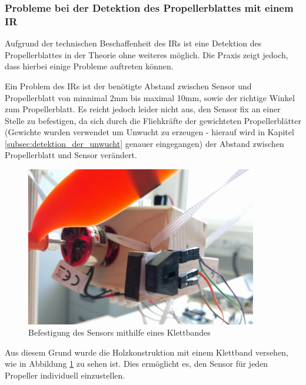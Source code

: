 
\subsubsection*{Probleme bei der Detektion des Propellerblattes mit einem \ac{IR}}
Aufgrund der technischen Beschaffenheit des \ac{IR}s ist eine Detektion des Propellerblattes in der Theorie ohne weiteres möglich.
Die Praxis zeigt jedoch, dass hierbei einige Probleme auftreten können.

Ein Problem des \ac{IR}s ist der benötigte Abstand zwischen Sensor und Propellerblatt von minnimal 2mm bis maximal 10mm, sowie der richtige Winkel zum Propellerblatt.
Es reicht jedoch leider nicht aus, den Sensor fix an einer Stelle zu befestigen, da sich durch die Fliehkräfte der gewichteten Propellerblätter (Gewichte wurden verwendet um Unwucht zu erzeugen - hierauf wird in Kapitel \ref{subsec:detektion_der_unwucht} genauer eingegangen) der Abstand zwischen Propellerblatt und Sensor verändert.
\begin{figure}[H]
	\centering
	\includegraphics[width=0.9\textwidth]{images/chapter/03/exp_ir_sensor.jpg}
	\caption{Befestigung des Sensors mithilfe eines Klettbandes}
	\label{fig:exp_ir_sensor}
\end{figure}
Aus diesem Grund wurde die Holzkonstruktion mit einem Klettband versehen, wie in Abbildung \ref{fig:exp_ir_sensor} zu sehen ist.
Dies ermöglicht es, den Sensor für jeden Propeller individuell einzustellen.

